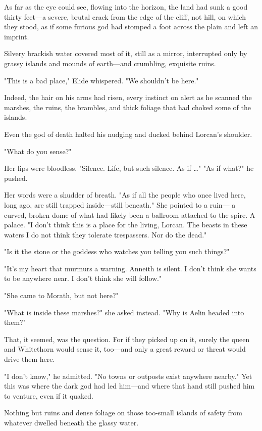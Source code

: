 As far as the eye could see, flowing into the horizon, the land had sunk a good thirty feet---a severe, brutal crack from the edge of the cliff, not hill, on which they stood, as if some furious god had stomped a foot across the plain and left an imprint.

Silvery brackish water covered most of it, still as a mirror, interrupted only by grassy islands and mounds of earth---and crumbling, exquisite ruins.

"This is a bad place," Elide whispered. "We shouldn't be here."

Indeed, the hair on his arms had risen, every instinct on alert as he scanned the marshes, the ruins, the brambles, and thick foliage that had choked some of the islands.

Even the god of death halted his nudging and ducked behind Lorcan's shoulder.

"What do you sense?"

Her lips were bloodless. "Silence. Life, but such  silence. As if \ldots" "As if what?" he pushed.

Her words were a shudder of breath. "As if all the people who once lived here, long ago, are still trapped inside---still 
beneath." She pointed to a ruin--- a curved, broken dome of what had likely been a ballroom attached to the spire. A palace. "I don't think this is a place for the living, Lorcan. The beasts in these waters
 I do not think they tolerate trespassers. Nor do the dead."

"Is it the stone or the goddess who watches you telling you such things?"

"It's my heart that murmurs a warning. Anneith is silent. I don't think she wants to be anywhere near. I don't think she will follow."

"She came to Morath, but not here?"

"What is inside these marshes?" she asked instead. "Why is Aelin headed into them?"

That, it seemed, was the question. For if they picked up on it, surely the queen and Whitethorn would sense it, too---and only a great reward or threat would drive them here.

"I don't know," he admitted. "No towns or outposts exist anywhere nearby." Yet this was where the dark god had led him---and where that hand still pushed him to venture, even if it quaked.

Nothing but ruins and dense foliage on those too-small islands of safety from whatever dwelled beneath the glassy water.

